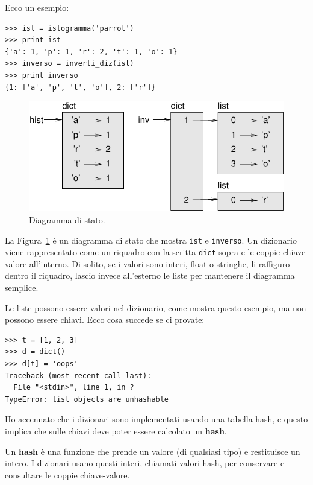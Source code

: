 \documentclass[10pt]{book}
\begin{document}
Ecco un esempio:

\begin{verbatim}
>>> ist = istogramma('parrot')
>>> print ist
{'a': 1, 'p': 1, 'r': 2, 't': 1, 'o': 1}
>>> inverso = inverti_diz(ist)
>>> print inverso
{1: ['a', 'p', 't', 'o'], 2: ['r']}
\end{verbatim}

\begin{figure}
\centerline
{\includegraphics[scale=0.8]{figs/dict1.pdf}}
\caption{Diagramma di stato.}
\label{fig.dict1}
\end{figure}

La Figura~\ref{fig.dict1} è un diagramma di stato che mostra {\tt ist} e {\tt inverso}.
Un dizionario viene rappresentato come un riquadro con la scritta {\tt dict} sopra e le coppie chiave-valore all'interno. Di solito, se i valori sono interi, float o stringhe, li raffiguro dentro il riquadro, lascio invece all'esterno le liste per mantenere il diagramma semplice.

Le liste possono essere valori nel dizionario, come mostra questo esempio, ma non possono essere chiavi. Ecco cosa succede se ci provate:


\begin{verbatim}
>>> t = [1, 2, 3]
>>> d = dict()
>>> d[t] = 'oops'
Traceback (most recent call last):
  File "<stdin>", line 1, in ?
TypeError: list objects are unhashable
\end{verbatim}
%
Ho accennato che i dizionari sono implementati usando una tabella hash, e questo implica che sulle chiavi deve poter essere calcolato un {\bf hash}.

Un {\bf hash} è una funzione che prende un valore (di qualsiasi tipo) e restituisce un intero. I dizionari usano questi interi, chiamati valori hash, per conservare e consultare le coppie chiave-valore.
\end{document}
